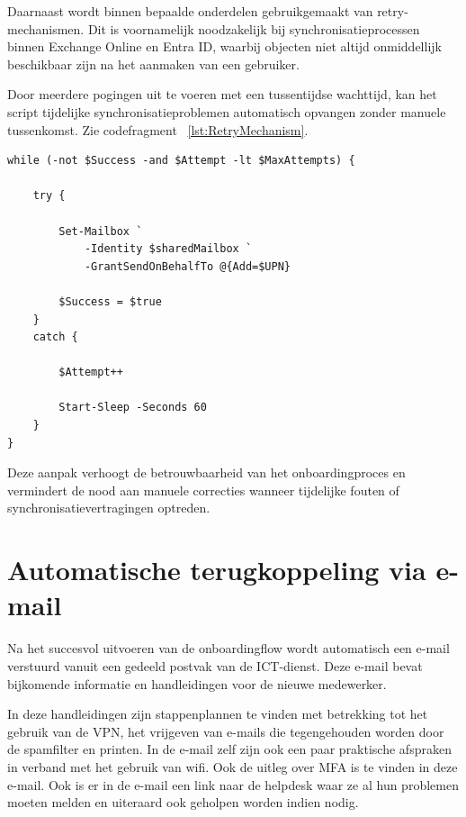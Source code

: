 Daarnaast wordt binnen bepaalde onderdelen gebruikgemaakt van re\-try-me\-cha\-nis\-men. Dit is voornamelijk noodzakelijk bij synchronisatieprocessen binnen Exchange Online en Entra ID, waarbij objecten niet altijd onmiddellijk beschikbaar zijn na het aanmaken van een gebruiker.

Door meerdere pogingen uit te voeren met een tussentijdse wachttijd, kan het script tijdelijke synchronisatieproblemen automatisch opvangen zonder manuele tussenkomst. Zie codefragment ~\ref{lst:RetryMechanism}.

\begin{listing}[ht]
\begin{verbatim}
while (-not $Success -and $Attempt -lt $MaxAttempts) {

    try {

        Set-Mailbox `
            -Identity $sharedMailbox `
            -GrantSendOnBehalfTo @{Add=$UPN}

        $Success = $true
    }
    catch {

        $Attempt++

        Start-Sleep -Seconds 60
    }
}
\end{verbatim}
\caption{Retry-mechanisme}
\label{lst:RetryMechanism}
\end{listing}

Deze aanpak verhoogt de betrouwbaarheid van het onboardingproces en vermindert de nood aan manuele correcties wanneer tijdelijke fouten of synchronisatievertragingen optreden.

\section{Automatische terugkoppeling via e-mail}

Na het succesvol uitvoeren van de onboardingflow wordt automatisch een e-mail verstuurd vanuit een gedeeld postvak van de ICT-dienst. Deze e-mail bevat bijkomende informatie en handleidingen voor de nieuwe medewerker.

In deze handleidingen zijn stappenplannen te vinden met betrekking tot het gebruik van de VPN, het vrijgeven van e-mails die tegengehouden worden door de spamfilter en printen. In de e-mail zelf zijn ook een paar praktische afspraken in verband met het gebruik van wifi. Ook de uitleg over MFA is te vinden in deze e-mail. Ook is er in de e-mail een link naar de helpdesk waar ze al hun problemen moeten melden en uiteraard ook geholpen worden indien nodig. 

